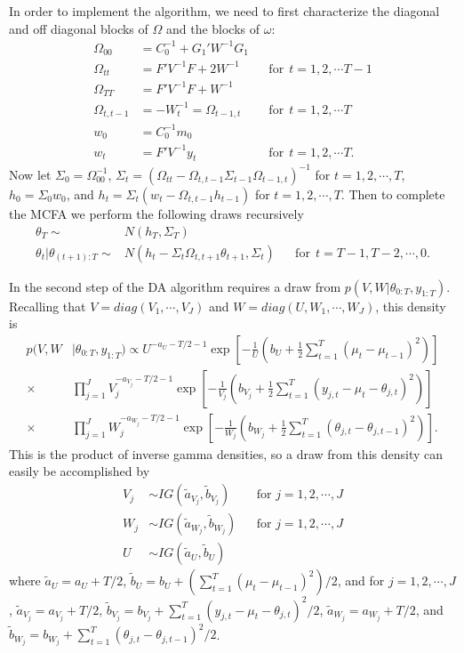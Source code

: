 \documentclass[graybox]{svmult}
\begin{document}
In order to implement the algorithm, we need to first characterize the diagonal and off diagonal blocks of $\Omega$ and the blocks of $\omega$:
\begin{align*}
  \Omega_{00} & = C_0^{-1} + G_1'W^{-1}G_1 && \\
  \Omega_{tt} & = F'V^{-1}F + 2W^{-1} &&  \mathrm{ for }\ \  t=1,2,\cdots T-1\\
  \Omega_{TT} & = F'V^{-1}F + W^{-1} && \\
  \Omega_{t,t-1} & = - W_t^{-1}=\Omega_{t-1,t} &&  \mathrm{ for }\ \  t=1,2,\cdots T\\
  w_0 & = C_0^{-1}m_0 &&\\
  w_t &= F'V^{-1}y_t &&  \mathrm{ for }\ \  t=1,2,\cdots T.
\end{align*}
Now let $\Sigma_0 = \Omega_{00}^{-1}$, $\Sigma_t = (\Omega_{tt} - \Omega_{t,t-1}\Sigma_{t-1}\Omega_{t-1,t})^{-1}$ for $t=1,2,\cdots,T$, $h_0 = \Sigma_0w_0$, and $h_t = \Sigma_t(w_t - \Omega_{t,t-1}h_{t-1})$ for $t=1,2,\cdots,T$. Then to complete the MCFA we perform the following draws recursively
\begin{align*}
  \theta_T \sim & N(h_T, \Sigma_T) &&\\
  \theta_{t}|\theta_{(t+1):T} \sim & N(h_t - \Sigma_t\Omega_{t,t+1}\theta_{t+1}, \Sigma_t) && \mathrm{for}\ \ t=T-1,T-2,\cdots,0.
\end{align*}

In the second step of the DA algorithm requires a draw from $p(V,W|\theta_{0:T},y_{1:T})$. Recalling that $V=diag(V_1,\cdots,V_J)$ and $W=diag(U,W_1,\cdots,W_J)$, this density is
\begin{align*}
p(V,W&|\theta_{0:T},y_{1:T}) \propto U^{-a_{U}-T/2-1}\exp\left[-\frac{1}{U}\left(b_U + \frac{1}{2}\sum_{t=1}^T(\mu_t - \mu_{t-1})^2\right)\right]\\
\times&\prod_{j=1}^J V_j^{-a_{V_j} - T/2 - 1}\exp\left[-\frac{1}{V_j}\left(b_{V_j} + \frac{1}{2}\sum_{t=1}^T(y_{j,t} - \mu_t - \theta_{j,t})^2\right)\right] \\
\times& \prod_{j=1}^JW_j^{-a_{W_j} - T/2 - 1}\exp\left[-\frac{1}{W_j}\left(b_{W_j} + \frac{1}{2}\sum_{t=1}^T(\theta_{j,t} - \theta_{j,t-1})^2\right)\right].
\end{align*}
This is the product of inverse gamma densities, so a draw from this density can easily be accomplished by
\begin{align*}
V_j &\sim IG(\tilde{a}_{V_j},\tilde{b}_{V_j}) &&\mbox{for } j=1,2,\cdots,J\\
W_j &\sim IG(\tilde{a}_{W_j},\tilde{b}_{W_j}) &&\mbox{for } j=1,2,\cdots,J\\
U &\sim IG(\tilde{a}_{U},\tilde{b}_U) &&
\end{align*}
where $\tilde{a}_U = a_U + T/2$, $\tilde{b}_U = b_U + (\sum_{t=1}^T(\mu_t - \mu_{t-1})^2)/2$, and for $j=1,2,\cdots,J$, $\tilde{a}_{V_j} = a_{V_j} + T/2$, $\tilde{b}_{V_j} = b_{V_j} + \sum_{t=1}^T(y_{j,t} - \mu_t - \theta_{j,t})^2/2$, $\tilde{a}_{W_j}=a_{W_j} + T/2$, and $\tilde{b}_{W_j} = b_{W_j} + \sum_{t=1}^T(\theta_{j,t} - \theta_{j,t-1})^2/2$.
\end{document}
